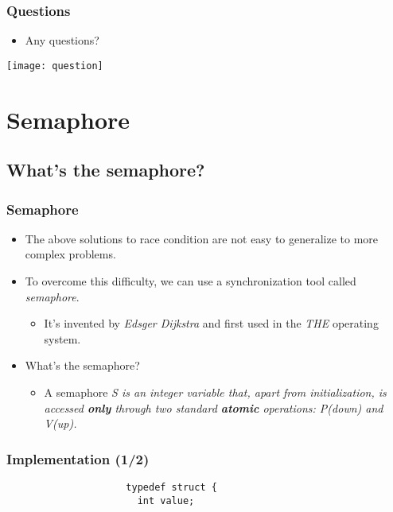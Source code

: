 \documentclass[CJKutf8,dvipsnames,table]{beamer}
\begin{document}
\begin{CJK*}{UTF8}{song}
  \begin{frame}
  \frametitle{Questions}
  \begin{itemize}
  \item Any questions? 
  \end{itemize}
  \begin{center}
    \texttt{[image: question]}
  \end{center}
  \end{frame}

\section{Semaphore}

\subsection{What's the semaphore?}

  \begin{frame}
  \frametitle{Semaphore} \pause
  \begin{itemize}
  \item The above solutions to race condition are not easy to generalize to more complex problems.  \pause
  \item To overcome this difficulty, we can use a synchronization tool called \emph{semaphore}.  \pause
    \begin{itemize}
    \item It's invented by \textit{Edsger Dijkstra} and first used in the \emph{THE} operating system.  \pause
    \end{itemize}
  \item What's the semaphore?  \pause
    \begin{itemize}
    \item A semaphore \emph{S  is an integer variable that, apart from
      initialization, is accessed \textbf{only} through two standard \textbf{atomic} operations: \emph{P}(\emph{down}) and \emph{V}(\emph{up}).}
    \end{itemize}
  \end{itemize}
  \end{frame}

  \begin{frame}[fragile]
  \frametitle{Implementation (1/2)} \pause

\begin{lstlisting}
                     typedef struct {
                       int value;


\end{lstlisting}
\end{frame}
\end{CJK*}
\end{document}
